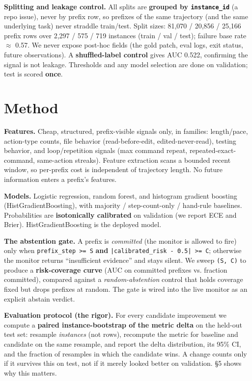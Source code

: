 \textbf{Splitting and leakage control.} All splits are \textbf{grouped by \texttt{instance\_id}} (a repo issue), never by prefix row, so prefixes of the same trajectory (and the same underlying task) never straddle train/test. Split sizes: 81,070 / 20,856 / 25,166 prefix rows over 2,297 / 575 / 719 instances (train / val / test); failure base rate $\approx$ 0.57. We never expose post-hoc fields (the gold patch, eval logs, exit status, future observations). A \textbf{shuffled-label control} gives AUC 0.522, confirming the signal is not leakage. Thresholds and any model selection are done on validation; test is scored \textbf{once}.

\section{Method}
\textbf{Features.} Cheap, structured, prefix-visible signals only, in families: length/pace, action-type counts, file behavior (read-before-edit, edited-never-read), testing behavior, and loop/repetition signals (max command repeat, repeated-exact-command, same-action streaks). Feature extraction scans a bounded recent window, so per-prefix cost is independent of trajectory length. No future information enters a prefix's features.

\textbf{Models.} Logistic regression, random forest, and histogram gradient boosting (HistGradientBoosting), with majority / step-count-only / hand-rule baselines. Probabilities are \textbf{isotonically calibrated} on validation (we report ECE and Brier). HistGradientBoosting is the deployed model.

\textbf{The abstention gate.} A prefix is \emph{committed} (the monitor is allowed to fire) only when \texttt{prefix\_step >= S} \textbf{and} \texttt{|calibrated\_risk - 0.5| >= C}; otherwise the monitor returns ``insufficient evidence'' and stays silent. We sweep \texttt{(S, C)} to produce a \textbf{risk-coverage curve} (AUC on committed prefixes vs. fraction committed), compared against a \emph{random-abstention} control that holds coverage fixed but drops prefixes at random. The gate is wired into the live monitor as an explicit abstain verdict.

\textbf{Evaluation protocol (the rigor).} For every candidate improvement we compute a \textbf{paired instance-bootstrap of the metric delta} on the held-out test set: resample \emph{instances} (not rows), recompute the metric for baseline and candidate on the same resample, and report the delta distribution, its 95\% CI, and the fraction of resamples in which the candidate wins. A change counts only if it survives this on test, not if it merely looked better on validation. \S5 shows why this matters.

